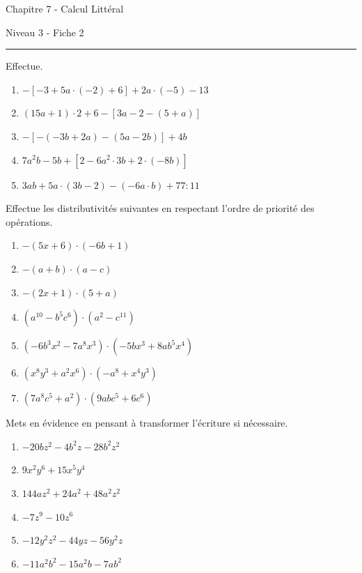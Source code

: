 \documentclass[12pt,parskip=half-, twoside=semi]{scrartcl}
\begin{document}
\begin{center}
  \bfseries
  \begin{Huge}
    Chapitre 7 - Calcul Littéral
  \end{Huge}
  \smallbreak
  \begin{large}
    Niveau 3  - Fiche 2
  \end{large}
  \smallbreak
  \rule[10pt]{.5\linewidth}{1 pt}
\end{center}

\setcounter{exercise}{0}

\begin{exercise}Effectue.
  \begin{enumerate}[cols=2]
    \item $-[-3+5 a \cdot(-2)+6]+2 a \cdot(-5)-13$
    \item $(15 a+1) \cdot 2+6-[3 a-2-(5+a)]$
    \item $-[-(-3 b+2 a)-(5 a-2 b)]+4 b$
    \item $7 a^2 b-5 b+\left[2-6 a^2 \cdot 3 b+2 \cdot(-8 b)\right]$
    \item $3 a b+5 a \cdot(3 b-2)-(-6 a \cdot b)+77: 11$
  \end{enumerate}
\end{exercise}


\begin{exercise}Effectue les distributivités suivantes en respectant l'ordre de priorité des opérations.
  \begin{enumerate}[cols=2]
     \item $-(5 x+6) \cdot(-6 b+1)$
     \item $-(a+b) \cdot(a-c)$
     \item $-(2 x+1) \cdot(5+a)$
     \item $\left(a^{10}-b^5 c^6\right) \cdot\left(a^2-c^{11}\right)$
     \item $\left(-6 b^3 x^2-7 a^8 x^3\right) \cdot\left(-5 b x^3+8 a b^5 x^4\right)$
     \item $\left(x^8 y^3+a^2 x^6\right) \cdot\left(-a^8+x^4 y^3\right)$
     \item $\left(7 a^8 c^5+a^2\right) \cdot\left(9 a b c^5+6 c^6\right)$
  \end{enumerate}
\end{exercise}


\begin{exercise}Mets en évidence en pensant à transformer l'écriture si nécessaire.
  \begin{enumerate}[cols=2]
      \item $-20 b z^2-4 b^2 z-28 b^2 z^2$
      \item $9 x^2 y^6+15 x^5 y^4$
      \item $144 a z^2+24 a^2+48 a^2 z^2$
      \item $-7 z^9-10 z^6$
      \item $-12 y^2 z^2-44 y z-56 y^2 z$
      \item $-11 a^2 b^2-15 a^2 b-7 a b^2$
  \end{enumerate}
\end{exercise}
\end{document}
